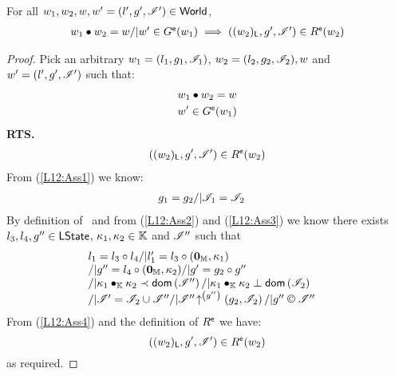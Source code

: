 %
%
\begin{lemma}[]\label{lem:extendGContainment}
%
For all $w_1, w_2, w, w' = (l', g', \mathscr{I}') \in \textsf{World}$,
\[
\begin{array}{l}
	w_1 \bullet w_2 = w /| w' \in G^{\textsf{e}}(w_1) \implies ((w_2)_{\textsf{L}}, g', \mathscr{I}') \in R^{\textsf{e}}(w_2)
\end{array}
\]
%
\begin{proof} Pick an arbitrary $w_1 = (l_1, g_1, \mathscr{I}_{1})$, $w_2 = (l_2, g_2, \mathscr{I}_{2}), w$ and $ w' = (l', g', \mathscr{I}')$ such that:
%
\begin{align}
	& w_1 \bullet  w_2 = w \label{L12:Ass1}\\
	& w' \in G^{\textsf{e}}(w_1) \label{L12:Ass2}
\end{align}
%
\textbf{RTS.}
%
\begin{align*}
	((w_2)_{\textsf{L}}, g', \mathscr{I}') \in R^{\textsf{e}}(w_2) 
\end{align*}
%
From (\ref{L12:Ass1}) we know:
%
\begin{align}
	& g_1 = g_2 /| \mathscr{I}_{1} = \mathscr{I}_{2} \label{L12:Ass3}
\end{align}
By definition of \extendG\ and from (\ref{L12:Ass2}) and (\ref{L12:Ass3}) we know there exists $l_3, l_4, g'' \in \textsf{LState}$, $\kappa_{1}, \kappa_{2} \in \mathbb{K}$ and $\mathscr{I}''$ such that
%
\begin{align}
& \begin{array}{l}
	l_1 = l_3 \composeL l_4 /| l'_1 = l_3 \composeL (\unitH, \ca{1})  \\
	/| g'' = l_4 \composeL (\unitH, \ca{2}) /| g' = g_2 \composeL g'' \\
	/| \ca{1} \composeCap \ca{2} \containedIn \dom{\lmod''} /|  \ca{1} \composeCap \ca{2} \disjoint \dom{\lmod_{2}} \\
	/| \lmod' = \lmod_{2} \cup \lmod'' 
	/| \expandsAM{\lmod''}{g''}{g_2}{\lmod_{2}} 
	/| g'' \containI \lmod'' 
\end{array}
\label{L12:Ass4}
\end{align}
%
From (\ref{L12:Ass4}) and the definition of $R^{\textsf{e}}$ we have:
%
\begin{equation*}
	((w_2)_{\textsf{L}}, g', \mathscr{I}{}') \in R^{\textsf{e}}(w_2) 
\end{equation*}
% 
as required.
\end{proof}
%
%
\end{lemma}
%
%
